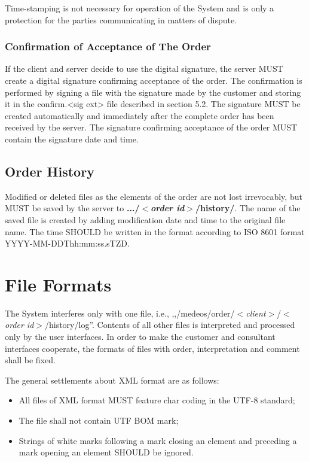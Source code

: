 \documentclass[a4paper]{article}
\begin{document}
Time-stamping is not necessary for operation of the System and is only a protection for 
the parties communicating in matters of dispute.

\subsubsection{Confirmation of Acceptance of The Order}

If the client and server decide to use the digital signature, the server MUST create a 
digital signature confirming acceptance of the order. The confirmation is performed by 
signing a file with the signature made by the customer and storing it in the 
confirm.<sig ext> file described in section 5.2. The signature MUST be created automatically 
and immediately after the complete order has been received by the server. The signature 
confirming acceptance of the order MUST contain the signature date and time.

\subsection{Order History}

Modified or deleted files as the elements of the order are not lost irrevocably, but MUST 
be saved by the server to 
\textbf{.../$<$\textit{order id}$>$/history/}. The name of 
the saved file is created 
by adding modification date and time to the original file name. The time SHOULD be 
written in the format according to ISO 8601 format YYYY-MM-DDThh:mm:ss.sTZD.

\section{File Formats}
\label{sec:formaty}

The System interferes only with one file, i.e., \newline
,,/medeos/order/$<$\textit{client}$>$/$<$\textit{order id}$>$/history/log''. \newline
Contents of all other files
is interpreted and processed only by the user interfaces. In order to make the customer and 
consultant interfaces cooperate, the formats of files with order, interpretation and comment 
shall be fixed.

The general settlements about XML format are as follows:
\begin{itemize}
	\item All files of XML format MUST feature char coding in the UTF-8 standard;
	\item The file shall not contain UTF BOM mark;
	\item Strings of white marks following a mark closing an element and preceding a 
		mark opening an element SHOULD be ignored.
\end{itemize}
\end{document}
